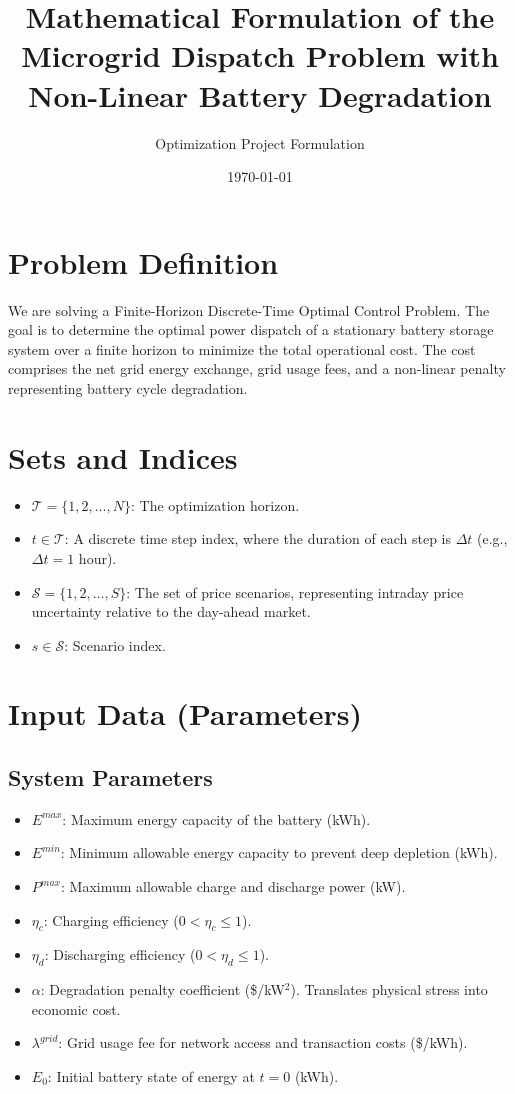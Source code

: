 \documentclass[12pt, a4paper]{article}
\title{\textbf{Mathematical Formulation of the Microgrid Dispatch Problem with Non-Linear Battery Degradation}}
\author{Optimization Project Formulation}
\date{\today}
\begin{document}
\maketitle

\section{Problem Definition}
We are solving a Finite-Horizon Discrete-Time Optimal Control Problem. The goal is to determine the optimal power dispatch of a stationary battery storage system over a finite horizon to minimize the total operational cost. The cost comprises the net grid energy exchange, grid usage fees, and a non-linear penalty representing battery cycle degradation.

\section{Sets and Indices}
\begin{itemize}
    \item $\mathcal{T} = \{1, 2, \dots, N\}$: The optimization horizon.
    \item $t \in \mathcal{T}$: A discrete time step index, where the duration of each step is $\Delta t$ (e.g., $\Delta t = 1$ hour).
    \item $\mathcal{S} = \{1, 2, \dots, S\}$: The set of price scenarios, representing intraday price uncertainty relative to the day-ahead market.
    \item $s \in \mathcal{S}$: Scenario index.
\end{itemize}

\section{Input Data (Parameters)}

\subsection{System Parameters}
\begin{itemize}
    \item $E^{max}$: Maximum energy capacity of the battery (kWh).
    \item $E^{min}$: Minimum allowable energy capacity to prevent deep depletion (kWh).
    \item $P^{max}$: Maximum allowable charge and discharge power (kW).
    \item $\eta_{c}$: Charging efficiency ($0 < \eta_{c} \le 1$).
    \item $\eta_{d}$: Discharging efficiency ($0 < \eta_{d} \le 1$).
    \item $\alpha$: Degradation penalty coefficient (\$/kW$^2$). Translates physical stress into economic cost.
    \item $\lambda^{grid}$: Grid usage fee for network access and transaction costs (\$/kWh).
    \item $E_0$: Initial battery state of energy at $t=0$ (kWh).
\end{itemize}
\end{document}
